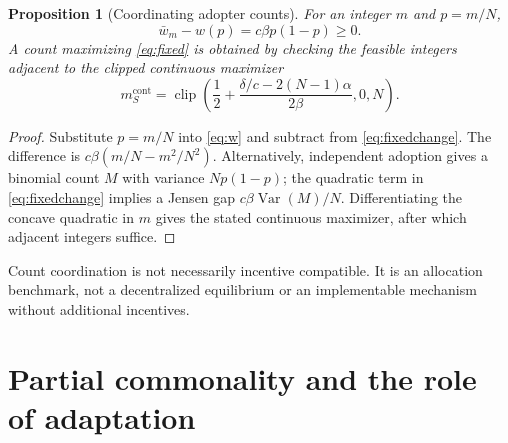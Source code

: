 \documentclass[11pt,a4paper]{article}
\newtheorem{proposition}[theorem]{Proposition}
\theoremstyle{definition}
\theoremstyle{remark}
\DeclareMathOperator{\clip}{clip}
\begin{document}
\begin{proposition}[Coordinating adopter counts]\label{prop:count}
For an integer $m$ and $p=m/N$,
\begin{equation}\label{eq:coord}
 \bar w_m-w(p)=c\beta p(1-p)\geq0.
\end{equation}
A count maximizing \eqref{eq:fixed} is obtained by checking the feasible integers adjacent to the clipped continuous maximizer
\begin{equation}
 m_S^{\mathrm{cont}}=\clip\left(
 \frac12+\frac{\delta/c-2(N-1)\alpha}{2\beta},0,N\right).
\end{equation}
\end{proposition}
\begin{proof}
Substitute $p=m/N$ into \eqref{eq:w} and subtract from \eqref{eq:fixedchange}. The difference is $c\beta(m/N-m^2/N^2)$. Alternatively, independent adoption gives a binomial count $M$ with variance $Np(1-p)$; the quadratic term in \eqref{eq:fixedchange} implies a Jensen gap $c\beta\operatorname{Var}(M)/N$. Differentiating the concave quadratic in $m$ gives the stated continuous maximizer, after which adjacent integers suffice.
\end{proof}
Count coordination is not necessarily incentive compatible. It is an allocation benchmark, not a decentralized equilibrium or an implementable mechanism without additional incentives.

\section{Partial commonality and the role of adaptation}
\end{document}
